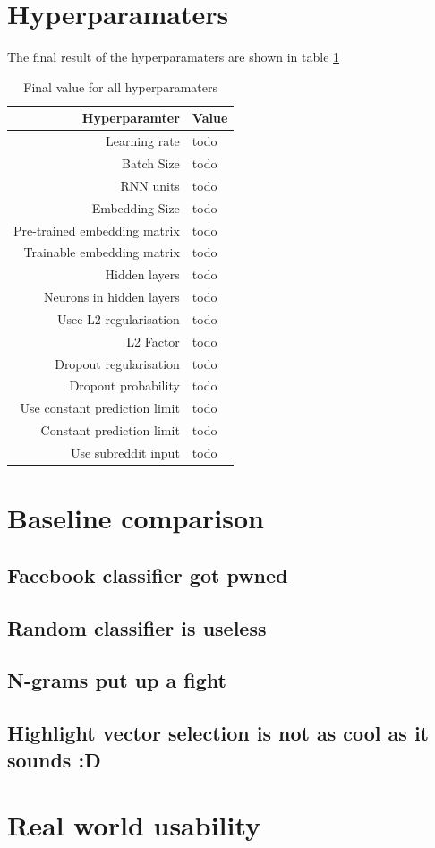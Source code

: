 \section{Hyperparamaters}
The final result of the hyperparamaters are shown in table \ref{table:hyperparameters_final}

\begin{table}[h!]
    \centering
    \begin{tabular}{ r  p{7cm} }
        \hline
        \textbf{Hyperparamter}  &  \textbf{Value} \\ \hline \hline
        Learning rate & todo  \\ \hline
        Batch Size & todo \\ \hline
        RNN units & todo  \\ \hline
        Embedding Size & todo \\ \hline
        Pre-trained embedding matrix & todo \\ \hline
        Trainable embedding matrix & todo \\ \hline
        Hidden layers & todo \\ \hline
        Neurons in hidden layers & todo \\ \hline
        Usee L2 regularisation & todo \\ \hline
        L2 Factor & todo \\ \hline
        Dropout regularisation & todo\\ \hline
        Dropout probability & todo \\ \hline
        Use constant prediction limit & todo \\ \hline
        Constant prediction limit & todo  \\ \hline
        Use subreddit input & todo \\ \hline
    \end{tabular}
    \caption{Final value for all hyperparamaters}
    \label{table:hyperparameters_final}
\end{table}
\section{Baseline comparison} 
\subsection{Facebook classifier got pwned}

\subsection{Random classifier is useless}

\subsection{N-grams put up a fight}

\subsection{Highlight vector selection is not as cool as it sounds :D}


\section{Real world usability}

